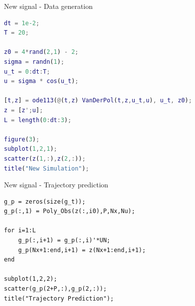 \documentclass{beamer}
\begin{document}
\begin{frame}[fragile]{New signal - Data generation}
    \begin{lstlisting}[language=matlab]
dt = 1e-2;
T = 20;

z0 = 4*rand(2,1) - 2;
sigma = randn(1);
u_t = 0:dt:T;
u = sigma * cos(u_t);

[t,z] = ode113(@(t,z) VanDerPol(t,z,u_t,u), u_t, z0);
z = [z';u];
L = length(0:dt:3);

figure(3);
subplot(1,2,1);
scatter(z(1,:),z(2,:));
title("New Simulation");
    \end{lstlisting}
\end{frame}

\begin{frame}[fragile]{New signal - Trajectory prediction}
    \begin{lstlisting}
g_p = zeros(size(g_t));
g_p(:,1) = Poly_Obs(z(:,i0),P,Nx,Nu);

for i=1:L
    g_p(:,i+1) = g_p(:,i)'*UN;
    g_p(Nx+1:end,i+1) = z(Nx+1:end,i+1);
end

subplot(1,2,2);
scatter(g_p(2+P,:),g_p(2,:));
title("Trajectory Prediction");
    \end{lstlisting}
\end{frame}
\end{document}
